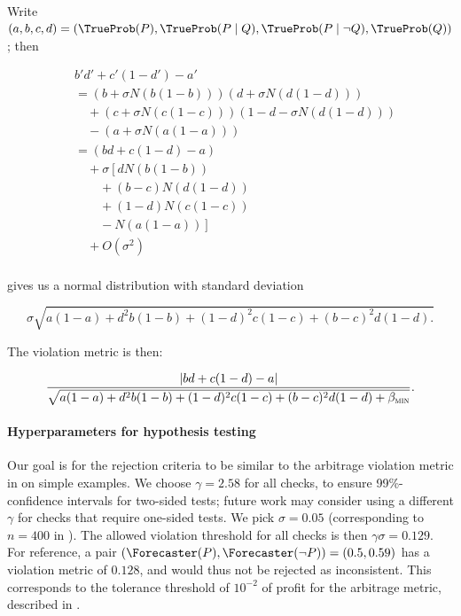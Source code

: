 \paragraph{\ExpectedEvidenceChecker}
\label{cfc:app:frequentist-ee}

Write $(a,b,c,d)=(\TrueProb(P),\TrueProb(P\mid Q),\TrueProb(P\mid\lnot Q), \TrueProb(Q))$; then

\begin{align*}
& b'd'+c'(1-d')-a' \\
& =
(b + \sigma N(b(1-b)))(d + \sigma N(d(1-d)))
\\ & \quad +
(c + \sigma N(c(1-c)))(1 - d - \sigma N(d(1-d)))
\\ & \quad - (a+\sigma N(a(1-a))) \\
& = (bd+c(1-d)-a)
\\ & \quad + \sigma \left[
d N(b(1-b))\right. \\
&\quad\quad + (b-c) N(d(1-d)) \\
&\quad\quad + (1-d)N(c(1-c)) \\
&\left.\quad\quad - N(a(1-a))
\right]
\\ & \quad + O(\sigma^2) \\
\end{align*}

gives us a normal distribution with standard deviation

\begin{equation*}
\sigma\sqrt{
a(1-a)
+ d^2 b (1-b)
+ (1-d)^2 c (1-c)
+ (b-c)^2 d (1-d).
}
\end{equation*}

The violation metric is then:

\begin{equation*}
\frac{
|bd+c(1-d)-a|
}{
\sqrt{
a(1-a)
+ d^2 b (1-b)
+ (1-d)^2 c (1-c)
+ (b-c)^2 d (1-d)
+ \beta_{\textsc{min}}
}
}.
\end{equation*}

\paragraph{Hyperparameters for hypothesis testing}
\label{cfc:sec:frequentist-hyperparams}
Our goal is for the rejection criteria to be similar to the arbitrage violation metric in  on simple examples.
We choose $\gamma = 2.58$ for all checks, to ensure 99\%-confidence intervals for two-sided tests;
future work may consider using a different $\gamma$ for checks that require one-sided tests.
We pick $\sigma = 0.05$ (corresponding to $n = 400$ in ).
The allowed violation threshold for all checks is then $\gamma \sigma = 0.129$.
For reference, a \NegChecker{} pair $(\Forecaster(P), \Forecaster(\neg P)) = (0.5, 0.59)$ has a violation metric of $0.128$, and would thus not be rejected as inconsistent.
This  corresponds to the tolerance threshold of $10^{-2}$ of profit for the arbitrage metric, described in .

